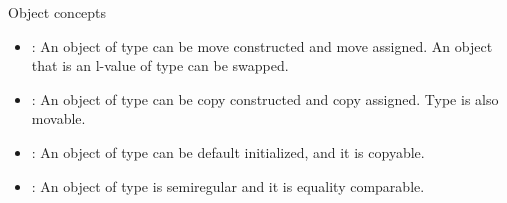 \begin{frame}[t,fragile]{Object concepts}
\begin{itemize}
  \item {}:
  An object of type  can be move constructed and move assigned.
  An object that is an l-value of type  can be swapped.

  \item {}:
  An object of type  can be copy constructed and copy assigned.
  Type  is also movable.

  \item {}:
  An object of type  can be default initialized, and it is copyable.

  \item {}:
  An object of type  is semiregular and it is equality comparable.
\end{itemize}
\end{frame}
